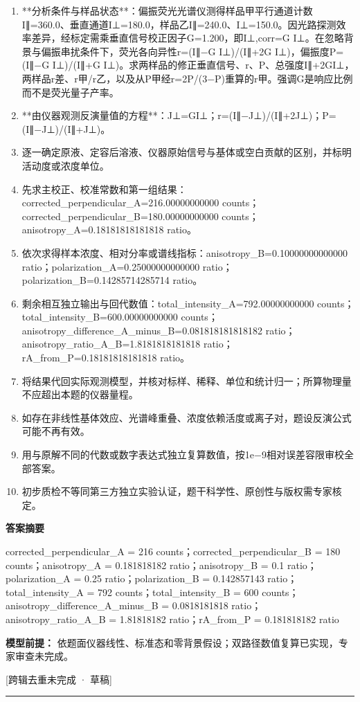 \documentclass[UTF8,11pt,a4paper]{ctexart}
\begin{document}
\begin{enumerate}
\item **分析条件与样品状态**：偏振荧光光谱仪测得样品甲平行通道计数I∥=360.0、垂直通道I⊥=180.0，样品乙I∥=240.0、I⊥=150.0。因光路探测效率差异，经标定需乘垂直信号校正因子G=1.200，即I⊥,corr=G I⊥。在忽略背景与偏振串扰条件下，荧光各向异性r=(I∥−G I⊥)/(I∥+2G I⊥)，偏振度P=(I∥−G I⊥)/(I∥+G I⊥)。求两样品的修正垂直信号、r、P、总强度I∥+2GI⊥，两样品r差、r甲/r乙，以及从P甲经r=2P/(3−P)重算的r甲。强调G是响应比例而不是荧光量子产率。
\item **由仪器观测反演量值的方程**：J⊥=GI⊥；r=(I∥−J⊥)/(I∥+2J⊥)；P=(I∥−J⊥)/(I∥+J⊥)。
\item 逐一确定原液、定容后溶液、仪器原始信号与基体或空白贡献的区别，并标明活动度或浓度单位。
\item 先求主校正、校准常数和第一组结果：corrected\_perpendicular\_A=216.00000000000 counts；corrected\_perpendicular\_B=180.00000000000 counts；anisotropy\_A=0.18181818181818 ratio。
\item 依次求得样本浓度、相对分率或谱线指标：anisotropy\_B=0.10000000000000 ratio；polarization\_A=0.25000000000000 ratio；polarization\_B=0.14285714285714 ratio。
\item 剩余相互独立输出与回代数值：total\_intensity\_A=792.00000000000 counts；total\_intensity\_B=600.00000000000 counts；anisotropy\_difference\_A\_minus\_B=0.081818181818182 ratio；anisotropy\_ratio\_A\_B=1.8181818181818 ratio；rA\_from\_P=0.18181818181818 ratio。
\item 将结果代回实际观测模型，并核对标样、稀释、单位和统计归一；所算物理量不应超出本题的仪器量程。
\item 如存在非线性基体效应、光谱峰重叠、浓度依赖活度或离子对，题设反演公式可能不再有效。
\item 用与原解不同的代数或数字表达式独立复算数值，按1e−9相对误差容限审校全部答案。
\item 初步质检不等同第三方独立实验认证，题干科学性、原创性与版权需专家核定。
\end{enumerate}
\noindent\textbf{答案摘要}\par
corrected\_perpendicular\_A = 216 counts；corrected\_perpendicular\_B = 180 counts；anisotropy\_A = 0.181818182 ratio；anisotropy\_B = 0.1 ratio；polarization\_A = 0.25 ratio；polarization\_B = 0.142857143 ratio；total\_intensity\_A = 792 counts；total\_intensity\_B = 600 counts；anisotropy\_difference\_A\_minus\_B = 0.0818181818 ratio；anisotropy\_ratio\_A\_B = 1.81818182 ratio；rA\_from\_P = 0.181818182 ratio\par
\noindent\textbf{模型前提：}
依题面仪器线性、标准态和零背景假设；双路径数值复算已实现，专家审查未完成。\par
\noindent\textcolor{red!65!black}{[跨辑去重未完成 · 草稿]} \par
\medskip\hrule\medskip
{}
\end{document}
